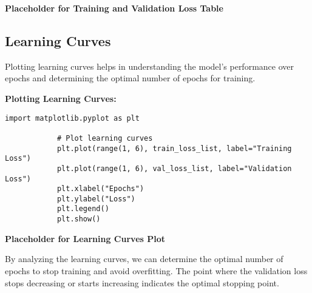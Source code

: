         \vspace{1em}

        \textbf{Placeholder for Training and Validation Loss Table}
            
    \subsection{Learning Curves}
    
        Plotting learning curves helps in understanding the model's performance over epochs and determining the optimal number of epochs for training.

        \textbf{Plotting Learning Curves:}

        \begin{lstlisting}[caption={Plot learning curves}, label={lst:plot_learning_curves}]
            import matplotlib.pyplot as plt

            # Plot learning curves
            plt.plot(range(1, 6), train_loss_list, label="Training Loss")
            plt.plot(range(1, 6), val_loss_list, label="Validation Loss")
            plt.xlabel("Epochs")
            plt.ylabel("Loss")
            plt.legend()
            plt.show()
        \end{lstlisting}
        
        \vspace{1em}

        \textbf{Placeholder for Learning Curves Plot}

        By analyzing the learning curves, we can determine the optimal number of epochs to stop training and avoid overfitting. The point where the validation loss stops decreasing or starts increasing indicates the optimal stopping point.
